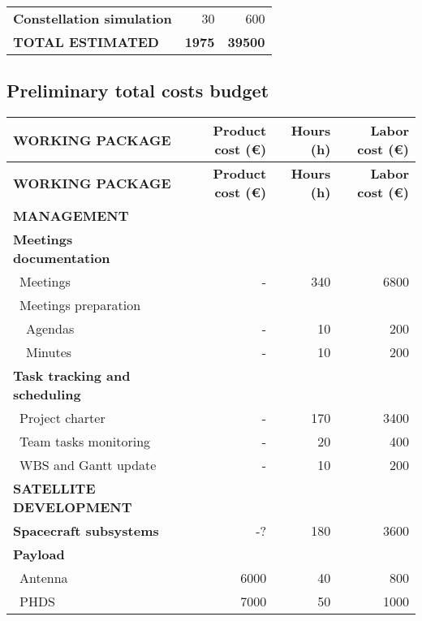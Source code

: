 \begin{longtable}{| l | r | r | }
	\textbf{Constellation simulation} & 30 & 600 \\


\rowcolor[gray]{0.65} \textbf{TOTAL ESTIMATED} & \textbf{1975} & \textbf{39500} \\
       \hline

\end{longtable}

\pagebreak

\subsection{Preliminary total costs budget}
\begin{longtable}{| l | r | r |r | }
	\hline
\rowcolor[gray]{0.65}	\textbf{WORKING PACKAGE} &\textbf{Product cost (\euro)}& \textbf{Hours (h)}     &  \textbf{Labor cost (\euro)}   \\
    \hline
    \endfirsthead

	\hline
\rowcolor[gray]{0.65}	\textbf{WORKING PACKAGE} &\textbf{Product cost (\euro)}& \textbf{Hours (h)}     &  \textbf{Labor cost (\euro)}   \\
    \hline
    \endhead

\rowcolor[gray]{0.85} \textbf{MANAGEMENT} & &  &  \\

   \textbf{Meetings documentation} & & & \\
	   \blue ~Meetings & - & 340  & 6800  \\
	   \blue ~Meetings preparation & & &   \\
	   ~~Agendas & - & 10 & 200 \\
	   ~~Minutes & - & 10 & 200 \\
	\hline
	\textbf{Task tracking and scheduling} & & & \\
	   \blue ~Project charter & - & 170 & 3400  \\
	   \blue ~Team tasks monitoring & - & 20 & 400  \\
	   \blue ~WBS and Gantt update & - & 10 & 200 \\

\rowcolor[gray]{0.85}	\textbf{SATELLITE DEVELOPMENT} & &  &   \\
	
	\textbf{Spacecraft subsystems} & -? & 180 & 3600  \\
	\hline
	\textbf{Payload} & & &  \\
	   \blue ~Antenna & 6000 & 40  & 800  \\
	   \blue ~PHDS & 7000 & 50  & 1000  \\


\end{longtable}
